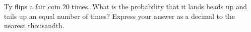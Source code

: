 Ty flips a fair coin $20$ times. What is the probability that it lands heads up and tails up an equal number of times? Express your answer as a decimal to the nearest thousandth.
